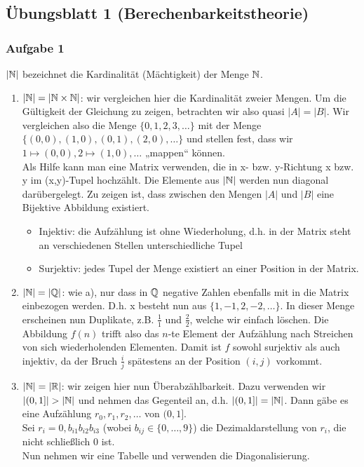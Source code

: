 \subsection*{Übungsblatt 1 (Berechenbarkeitstheorie)}

\subsubsection*{Aufgabe 1}
    $|\mathbb{N}|$ bezeichnet die Kardinalität (Mächtigkeit) der Menge $\mathbb{N}$.
    \begin{enumerate}
        \item $|\mathbb{N}| = |\mathbb{N} \times \mathbb{N}|$: wir vergleichen hier die Kardinalität zweier Mengen. Um die Gültigkeit der Gleichung zu zeigen, betrachten wir also quasi $|A| = |B|$. Wir vergleichen also die Menge $\{0, 1, 2, 3, \dots\}$ mit der Menge $\{(0,0), (1,0), (0,1), (2,0), \dots\}$ und stellen fest, dass wir $1 \mapsto (0,0), 2\mapsto(1,0), \dots$ „mappen“ können. \\
        Als Hilfe kann man eine Matrix verwenden, die in x- bzw. y-Richtung x bzw. y im (x,y)-Tupel hochzählt. Die Elemente aus $|\mathbb{N}|$ werden nun diagonal darübergelegt.
        Zu zeigen ist, dass zwischen den Mengen $|A|$ und $|B|$ eine Bijektive Abbildung existiert.
        \begin{itemize}
            \item Injektiv: die Aufzählung ist ohne Wiederholung, d.h. in der Matrix steht an verschiedenen Stellen unterschiedliche Tupel
            \item Surjektiv: jedes Tupel der Menge existiert an einer Position in der Matrix.
        \end{itemize}


        \item $|\mathbb{N}| = |\mathbb{Q}|$: wie a), nur dass in $\mathbb{Q}$ negative Zahlen ebenfalls mit in die Matrix einbezogen werden. D.h. x besteht nun aus $\{1,-1,2,-2,\dots\}$. In dieser Menge erscheinen nun Duplikate, z.B. $\frac{1}{1}$ und $\frac{2}{2}$, welche wir einfach löschen. Die Abbildung $f(n)$ trifft also das $n$-te Element der Aufzählung nach Streichen von sich wiederholenden Elementen. Damit ist $f$ sowohl surjektiv als auch injektiv, da der Bruch $\frac{i}{j}$ spätestens an der Position $(i, j)$ vorkommt.

        \item $|\mathbb{N}| = |\mathbb{R}|$: wir zeigen hier nun Überabzählbarkeit. Dazu verwenden wir $|(0,1]| > |\mathbb{N}|$ und nehmen das Gegenteil an, d.h. $|(0,1]| = |\mathbb{N}|$. Dann gäbe es eine Aufzählung $r_{0}, r_{1}, r_{2},\dots$ von $(0,1]$. \\
            Sei $r_{i} = 0,b_{i1}b_{i2}b_{i3}$ (wobei $b_{ij} \in \{0,\dots,9\}$) die Dezimaldarstellung von $r_{i}$, die nicht schließlich $0$ ist. \\
            Nun nehmen wir eine Tabelle und verwenden die Diagonalisierung.


\end{enumerate}
